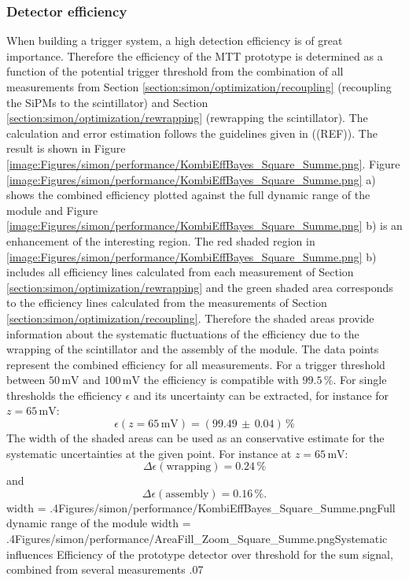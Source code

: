 \subsubsection{Detector efficiency}
When building a trigger system, a high detection efficiency is of great importance. Therefore the efficiency of the MTT prototype is determined as a function of the potential trigger threshold from the combination of all measurements from Section \ref{section:simon/optimization/recoupling} (recoupling the SiPMs to the scintillator) and Section \ref{section:simon/optimization/rewrapping} (rewrapping the scintillator). The calculation and error estimation follows the guidelines given in ((REF)). The result is shown in Figure \ref{image:Figures/simon/performance/KombiEffBayes_Square_Summe.png}. Figure \ref{image:Figures/simon/performance/KombiEffBayes_Square_Summe.png} a) shows the combined efficiency plotted against the full dynamic range of the module and Figure \ref{image:Figures/simon/performance/KombiEffBayes_Square_Summe.png} b) is an enhancement of the interesting region. The red shaded region in \ref{image:Figures/simon/performance/KombiEffBayes_Square_Summe.png} b) includes all efficiency lines calculated from each measurement of Section \ref{section:simon/optimization/rewrapping} and the green shaded area corresponds to the efficiency lines calculated from the measurements of Section \ref{section:simon/optimization/recoupling}. Therefore the shaded areas provide information about the systematic fluctuations of the efficiency due to the wrapping of the scintillator and the assembly of the module. The data points represent the combined efficiency for all measurements. For a trigger threshold between $50\,\text{mV}$ and $100\,\text{mV}$ the efficiency is compatible with $99.5\,\%$. For single thresholds the efficiency $\epsilon$ and its uncertainty can be extracted, for instance for $z = 65\,\text{mV}$:
\begin{equation}
 \epsilon(z = 65\,\text{mV}) = (99.49\,\pm\,0.04)\,\%
\end{equation}
The width of the shaded areas can be used as an conservative estimate for the systematic uncertainties at the given point. For instance at $z = 65\,\text{mV}$:
\begin{equation}
 \Delta\epsilon(\text{wrapping}) = 0.24\,\%
\end{equation}
and
\begin{equation}
 \Delta\epsilon(\text{assembly}) = 0.16\,\%.
\end{equation}
\doubleimage
{width = .4\textwidth}{Figures/simon/performance/KombiEffBayes_Square_Summe.png}{Full dynamic range of the module}
{width = .4\textwidth}{Figures/simon/performance/AreaFill_Zoom_Square_Summe.png}{Systematic influences}
{Efficiency of the prototype detector over threshold for the sum signal, combined from several measurements}
{.07\textwidth}
